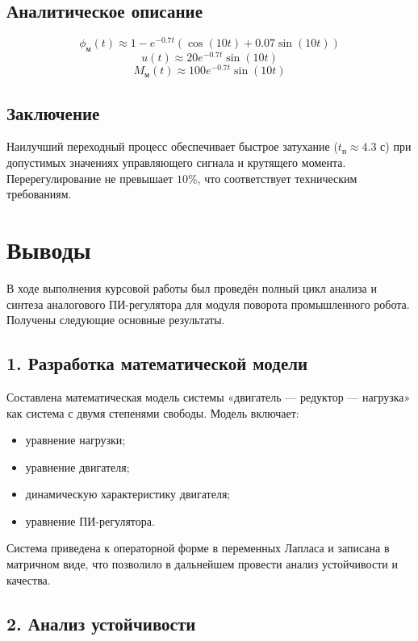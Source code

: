 \documentclass[14pt]{extreport}
\begin{document}
{\subsection*{Аналитическое описание}
\[
\phi_{\text{м}}(t) \approx 1 - e^{-0.7t} \left( \cos(10t) + 0.07 \sin(10t) \right)
\]
\[
u(t) \approx 20 e^{-0.7t} \sin(10t)
\]
\[
M_{\text{м}}(t) \approx 100 e^{-0.7t} \sin(10t)
\]

\subsection*{Заключение}
Наилучший переходный процесс обеспечивает быстрое затухание ($t_{\text{п}} \approx 4.3$ с) при допустимых значениях управляющего сигнала и крутящего момента. Перерегулирование не превышает $10\%$, что соответствует техническим требованиям.

        \newpage

        \section*{Выводы}
В ходе выполнения курсовой работы был проведён полный цикл анализа и синтеза аналогового ПИ-регулятора для модуля поворота промышленного робота. Получены следующие основные результаты.

\subsection*{1. Разработка математической модели}

Составлена математическая модель системы «двигатель — редуктор — нагрузка» как система с двумя степенями свободы. Модель включает:
\begin{itemize}
    \item уравнение нагрузки;
    \item уравнение двигателя;
    \item динамическую характеристику двигателя;
    \item уравнение ПИ-регулятора.
\end{itemize}
Система приведена к операторной форме в переменных Лапласа и записана в матричном виде, что позволило в дальнейшем провести анализ устойчивости и качества.

\subsection*{2. Анализ устойчивости}

}
\end{document}
